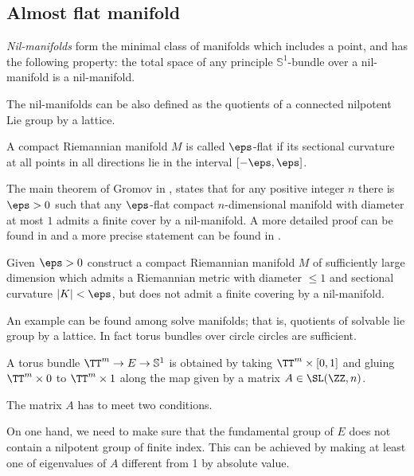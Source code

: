 \subsection*{Almost flat manifold\easy}
\label{almost-flat}

\emph{Nil-manifolds} form the minimal class of manifolds which includes a point, and has the following property:  
the total space of any principle $\mathbb{S}^1$-bundle over a nil-manifold is a nil-manifold. 

The nil-manifolds can be also defined as the quotients of a connected nilpotent Lie group by a lattice.

A compact Riemannian manifold $M$ is called $\eps$-flat if its sectional curvature at all points in all directions lie in the interval $[-\eps,\eps]$. 

The main theorem of Gromov in \cite{gromov-almost-flat}, 
states that for any positive integer $n$ there is $\eps>0$ such that any $\eps$-flat compact $n$-dimensional manifold with diameter at most $1$ admits a finite cover by a nil-manifold.
A more detailed proof can be found in \cite{buser-karcher}
and a more precise statement can be found in \cite{ruh}.

\begin{pr}
Given $\eps>0$ construct a compact Riemannian manifold $M$ of sufficiently large dimension which admits a Riemannian metric with diameter $\le 1$ and sectional
curvature $|K|<\eps$,
but does not admit a finite covering by a nil-manifold.
\end{pr}


An example can be found among solve manifolds;
that is, quotients of solvable lie group by a lattice.
In fact torus bundles over circle circles are sufficient.

\medskip

A torus bundle $\TT^m\to E\to\mathbb{S}^1$ is obtained by taking $\TT^m\times [0,1]$ and gluing $\TT^m\times 0$ to $\TT^m\times 1$ along the map given by a matrix $A\in \SL(\ZZ,n)$.

The matrix $A$ has to meet two conditions.

On one hand, we need to make sure that the fundamental group of $E$ does not contain a nilpotent group of finite index.
This can be achieved by making at least one of eigenvalues of $A$ different from 1 by absolute value.


